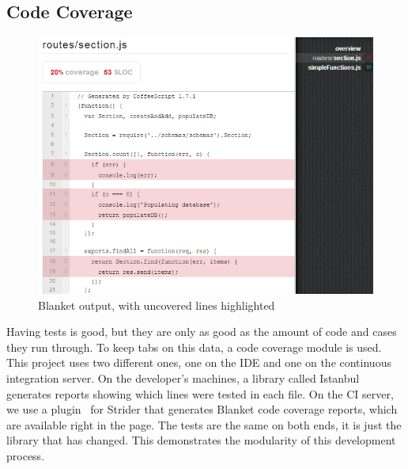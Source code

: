 \documentclass[12pt]{article}
\begin{document}
\subsection{Code Coverage}\label{sec:coverage}
\begin{figure}[h!]
\includegraphics[width=\linewidth]{img/strider_3.png}
\caption{Blanket output, with uncovered lines highlighted}
\end{figure}
Having tests is good, but they are only as good as the amount of code and cases they run through. To keep tabs on this data, a code coverage module is used. This project uses two different ones, one on the IDE and one on the continuous integration server. On the developer's machines, a library called Istanbul~\cite{Istanbul} generates reports showing which lines were tested in each file. On the CI server, we use a plugin~\cite{Blanket} for Strider that generates Blanket code coverage reports, which are available right in the page. The tests are the same on both ends, it is just the library that has changed. This demonstrates the modularity of this development process.
\end{document}
